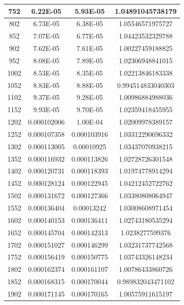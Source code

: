 \documentclass{article}
\begin{document}
\begin{longtable}{|c|c|c|c|}
		752	    &   6.22E-05	  & 5.93E-05	 &  1.04891045738179   \\ \hline
		802	    &   6.73E-05	  & 6.38E-05	 &  1.05546571975727   \\ \hline
		852	    &   7.07E-05	  & 6.77E-05	 &  1.04423532329788   \\ \hline
		902	    &   7.62E-05	  & 7.61E-05	 &  1.00227459188825   \\ \hline
		952	    &   8.08E-05	  & 7.89E-05	 &  1.02306948841015   \\ \hline
		1002	&   8.53E-05	  & 8.35E-05	 &  1.02213846183338   \\ \hline
		1052	&   8.83E-05	  & 8.88E-05	 &  0.994514833040303   \\ \hline
		1102	&   9.37E-05	  & 9.28E-05	 &  1.00986884988036   \\ \hline
		1152	&   9.93E-05	  & 9.70E-05	 &  1.02359418455955   \\ \hline
		1202	&   0.000102006	  & 1.00E-04	 &  1.02009978389157   \\ \hline
		1252	&   0.000107358	  & 0.000103916	 &  1.03312290696332   \\ \hline
		1302	&   0.000113005	  & 0.00010925	 &  1.03437070938215   \\ \hline
		1352	&   0.000116932	  & 0.000113826	 &  1.02728726301548   \\ \hline
		1402	&   0.000120731	  & 0.000118393	 &  1.01974778914294   \\ \hline
		1452	&   0.000128124	  & 0.000122945	 &  1.04212452722762   \\ \hline
		1502	&   0.000131672	  & 0.000127366	 &  1.03380808064947   \\ \hline
		1552	&   0.000136404	  & 0.00013242	 &  1.03008608971454   \\ \hline
		1602	&   0.000140153	  & 0.000136411	 &  1.02743180535294   \\ \hline
		1652	&   0.000145704	  & 0.000142313	 &  1.0238277599376   \\ \hline
		1702	&   0.000151027	  & 0.000146299	 &  1.03231737742568   \\ \hline
		1752	&   0.000156419	  & 0.000150775	 &  1.03743326148234   \\ \hline
		1802	&   0.000162374	  & 0.000161107	 &  1.00786433860726   \\ \hline
		1852	&   0.000168315	  & 0.000170044	 &  0.989832043471102   \\ \hline
		1902	&   0.000171145	  & 0.000170165	 &  1.00575911615197   \\ \hline

\end{longtable}
\end{document}
